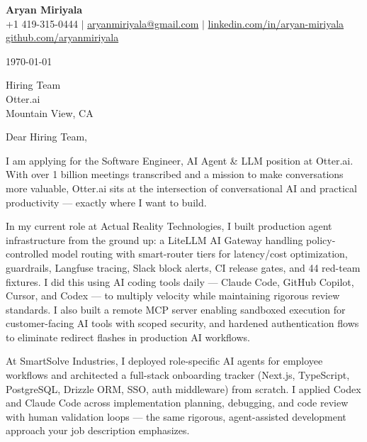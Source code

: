 \documentclass[letterpaper,11pt]{article}
\begin{document}
\begin{center}
  {\LARGE \textbf{Aryan Miriyala}}\\[2pt]
  \small
  +1 419-315-0444 $|$ \href{mailto:aryanmiriyala@gmail.com}{aryanmiriyala@gmail.com} $|$ \href{https://www.linkedin.com/in/aryan-miriyala-7788a21b6/}{linkedin.com/in/aryan-miriyala}\\
  \href{https://github.com/aryanmiriyala}{github.com/aryanmiriyala}
\end{center}\vspace{8pt}

\today

\vspace{8pt}

Hiring Team\\
Otter.ai\\
Mountain View, CA

\vspace{8pt}

Dear Hiring Team,

\vspace{4pt}

I am applying for the Software Engineer, AI Agent \& LLM position at Otter.ai. With over 1 billion meetings transcribed and a mission to make conversations more valuable, Otter.ai sits at the intersection of conversational AI and practical productivity — exactly where I want to build.

\vspace{4pt}

In my current role at Actual Reality Technologies, I built production agent infrastructure from the ground up: a LiteLLM AI Gateway handling policy-controlled model routing with smart-router tiers for latency/cost optimization, guardrails, Langfuse tracing, Slack block alerts, CI release gates, and 44 red-team fixtures. I did this using AI coding tools daily — Claude Code, GitHub Copilot, Cursor, and Codex — to multiply velocity while maintaining rigorous review standards. I also built a remote MCP server enabling sandboxed execution for customer-facing AI tools with scoped security, and hardened authentication flows to eliminate redirect flashes in production AI workflows.

\vspace{4pt}

At SmartSolve Industries, I deployed role-specific AI agents for employee workflows and architected a full-stack onboarding tracker (Next.js, TypeScript, PostgreSQL, Drizzle ORM, SSO, auth middleware) from scratch. I applied Codex and Claude Code across implementation planning, debugging, and code review with human validation loops — the same rigorous, agent-assisted development approach your job description emphasizes.
\end{document}
